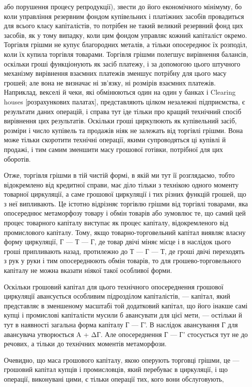 \parcont{}  %
або порушення процесу репродукції), звести до його економічного
мінімуму, бо коли управління резервним фондом купівельних
і платіжних засобів провадиться для всього класу капіталістів, то
потрібен не такий великий резервний фонд цих засобів, як у тому
випадку, коли цим фондом управляє кожний капіталіст окремо.
Торгівля грішми не купує благородних металів, а тільки опосереднює
їх розподіл, коли їх купила торгівля товарами. Торгівля грішми
полегшує вирівнення балансів, оскільки гроші функціонують як
засіб платежу, і за допомогою цього штучного механізму вирівнення
взаємних платежів зменшує потрібну для цього масу грошей;
але вона не визначає ні зв’язку, ні розмірів взаємних платежів.
Наприклад, векселі й чеки, які обмінюються один на один
у банках і Clearing houses [розрахункових палатах], представляють цілком
незалежні підприємства, є результати даних операцій,
і справа тут іде тільки про кращий технічний спосіб вирівнення
цих результатів. Оскільки гроші циркулюють як купівельний
засіб, розміри і число купівель та продажів ніяк не залежать
від торгівлі грішми. Вона може тільки скоротити технічні операції,
якими супроводяться ці купівлі й продажі, і тим самим
зменшити масу грошової готівки, потрібної для цих оборотів.

Отже, торгівля грішми в тій чистій формі, в якій ми тут її
розглядаємо, тобто відокремлено від кредитної справи, має діло
тільки з технікою одного моменту товарної циркуляції, а саме
грошової циркуляції і тих різних функцій грошей, що з неї випливають.
Це істотно відрізняє торгівлю грішми від торгівлі товарами,
яка опосереднює метаморфозу товару і обмін товарів або зумовлює
те, що самий цей процес товарного капіталу виступає
як процес капіталу, відокремленого від промислового капіталу.
Тому, якщо товарно-торговельний капітал виявляє власну форму
циркуляції, Г — Т — Г, де товар двічі міняє місце і в наслідок
цього гроші припливають назад, протилежно до Т — Г — Т,
де гроші двічі переходять з рук у руки і тим опосереднюють
обмін товарів, то для грошево-торговельного капіталу не можна
вказати ніякої такої особливої форми.

Оскільки грошовий капітал для цього технічного опосереднення
грошової циркуляції авансується особливим підрозділом
капіталістів, — капітал, який представляє в зменшеному масштабі
той додатковий капітал, що його інакше самі купці і промислові
капіталісти мусили б авансувати для цієї мети, — остільки й тут
в наявності загальна форма капіталу Г — Г'. В наслідок авансування
Г для авансувача утворюється A + ΔГ. Але опосереднення
Г — Г' стосується тут не до речових, а тільки до технічних
моментів метаморфози.

Очевидно, що маса грошового капіталу, якою оперують торговці
грішми, це — грошовий капітал купців і промисловців, який
перебуває в циркуляції, і що операції, виконувані цими, є тільки
операції тих, кого вони обслуговують,
